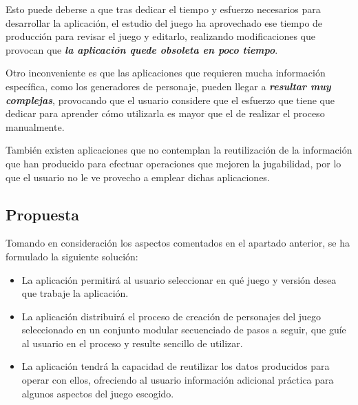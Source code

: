 Esto puede deberse a que tras dedicar el tiempo y esfuerzo necesarios para 
desarrollar la aplicación, el estudio del juego ha aprovechado ese tiempo 
de producción para revisar el juego y editarlo, realizando modificaciones 
que provocan que \emph{\textbf{la aplicación quede obsoleta en poco tiempo}}. 
\medskip

Otro inconveniente es que las aplicaciones que requieren mucha información 
específica, como los generadores de personaje, pueden llegar a 
\emph{\textbf{resultar muy complejas}}, provocando que el usuario 
considere que el esfuerzo que tiene que dedicar para aprender cómo utilizarla 
es mayor que el de realizar el proceso manualmente. \medskip

También existen aplicaciones que no contemplan la reutilización de la 
información que han producido para efectuar operaciones que mejoren 
la jugabilidad, por lo que el usuario no le ve provecho a emplear dichas
aplicaciones.

\subsection{Propuesta}
Tomando en consideración los aspectos comentados en el apartado anterior, 
se ha formulado la siguiente solución:
\begin{itemize}
    \item La aplicación permitirá al usuario seleccionar en qué juego y 
    versión desea que trabaje la aplicación.
    \item La aplicación distribuirá el proceso de creación de personajes del 
    juego seleccionado en un conjunto modular secuenciado de pasos a seguir, 
    que guíe al usuario en el proceso y resulte sencillo de utilizar. 
    \item La aplicación tendrá la capacidad de reutilizar los datos 
    producidos para operar con ellos, ofreciendo al usuario información 
    adicional práctica para algunos aspectos del juego escogido.
\end{itemize}





